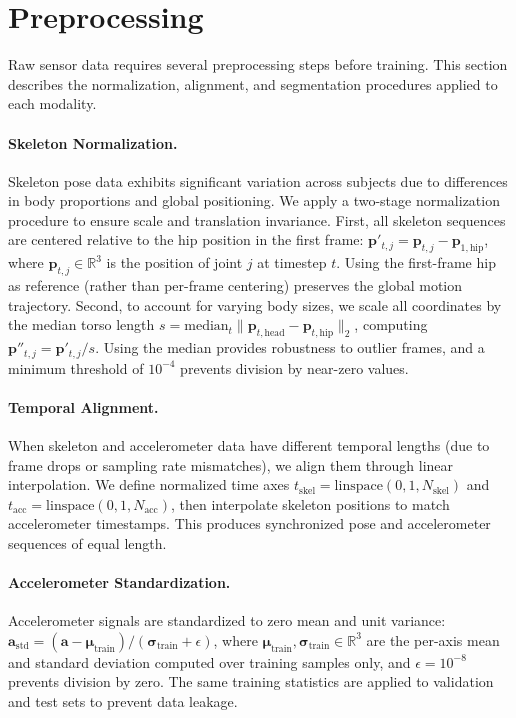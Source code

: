 \section{Preprocessing}
\label{sec:preprocessing}

Raw sensor data requires several preprocessing steps before training. This section describes the normalization, alignment, and segmentation procedures applied to each modality.

\paragraph{Skeleton Normalization.}
Skeleton pose data exhibits significant variation across subjects due to differences in body proportions and global positioning. We apply a two-stage normalization procedure to ensure scale and translation invariance. First, all skeleton sequences are centered relative to the hip position in the first frame: $\mathbf{p}'_{t,j} = \mathbf{p}_{t,j} - \mathbf{p}_{1,\text{hip}}$, where $\mathbf{p}_{t,j} \in \mathbb{R}^3$ is the position of joint $j$ at timestep $t$. Using the first-frame hip as reference (rather than per-frame centering) preserves the global motion trajectory. Second, to account for varying body sizes, we scale all coordinates by the median torso length $s = \text{median}_{t} \|\mathbf{p}_{t,\text{head}} - \mathbf{p}_{t,\text{hip}}\|_2$, computing $\mathbf{p}''_{t,j} = \mathbf{p}'_{t,j}/s$. Using the median provides robustness to outlier frames, and a minimum threshold of $10^{-4}$ prevents division by near-zero values.

\paragraph{Temporal Alignment.}
When skeleton and accelerometer data have different temporal lengths (due to frame drops or sampling rate mismatches), we align them through linear interpolation. We define normalized time axes $t_{\text{skel}} = \text{linspace}(0, 1, N_{\text{skel}})$ and $t_{\text{acc}} = \text{linspace}(0, 1, N_{\text{acc}})$, then interpolate skeleton positions to match accelerometer timestamps. This produces synchronized pose and accelerometer sequences of equal length.

\paragraph{Accelerometer Standardization.}
Accelerometer signals are standardized to zero mean and unit variance: $\mathbf{a}_{\text{std}} = (\mathbf{a} - \boldsymbol{\mu}_{\text{train}})/(\boldsymbol{\sigma}_{\text{train}} + \epsilon)$, where $\boldsymbol{\mu}_{\text{train}}, \boldsymbol{\sigma}_{\text{train}} \in \mathbb{R}^3$ are the per-axis mean and standard deviation computed over training samples only, and $\epsilon = 10^{-8}$ prevents division by zero. The same training statistics are applied to validation and test sets to prevent data leakage.

